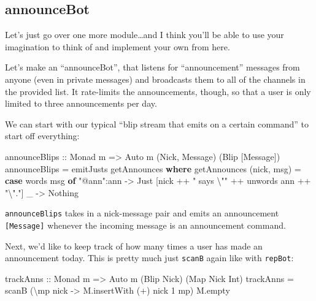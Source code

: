 \documentclass[]{article}
\newenvironment{Shaded}{}{}
\newcommand{\KeywordTok}[1]{\textcolor[rgb]{0.00,0.44,0.13}{\textbf{{#1}}}}
\newcommand{\DataTypeTok}[1]{\textcolor[rgb]{0.56,0.13,0.00}{{#1}}}
\newcommand{\DecValTok}[1]{\textcolor[rgb]{0.25,0.63,0.44}{{#1}}}
\newcommand{\StringTok}[1]{\textcolor[rgb]{0.25,0.44,0.63}{{#1}}}
\newcommand{\OtherTok}[1]{\textcolor[rgb]{0.00,0.44,0.13}{{#1}}}
\newcommand{\FunctionTok}[1]{\textcolor[rgb]{0.02,0.16,0.49}{{#1}}}
\newcommand{\NormalTok}[1]{{#1}}
\begin{document}
\subsection{announceBot}\label{announcebot}

Let's just go over one more module\ldots{}and I think you'll be able to
use your imagination to think of and implement your own from here.

Let's make an ``announceBot'', that listens for ``announcement''
messages from anyone (even in private messages) and broadcasts them to
all of the channels in the provided list. It rate-limits the
announcements, though, so that a user is only limited to three
announcements per day.

We can start with our typical ``blip stream that emits on a certain
command'' to start off everything:

\begin{Shaded}
\begin{Highlighting}[]
\OtherTok{announceBlips ::} \DataTypeTok{Monad} \NormalTok{m }\OtherTok{=>} \DataTypeTok{Auto} \NormalTok{m (}\DataTypeTok{Nick}\NormalTok{, }\DataTypeTok{Message}\NormalTok{) (}\DataTypeTok{Blip} \NormalTok{[}\DataTypeTok{Message}\NormalTok{])}
\NormalTok{announceBlips }\FunctionTok{=} \NormalTok{emitJusts getAnnounces}
  \KeywordTok{where}
    \NormalTok{getAnnounces (nick, msg) }\FunctionTok{=}
      \KeywordTok{case} \NormalTok{words msg }\KeywordTok{of}
        \StringTok{"@ann"}\FunctionTok{:}\NormalTok{ann }\OtherTok{->} \DataTypeTok{Just} \NormalTok{[nick }\FunctionTok{++} \StringTok{" says \textbackslash{}""} \FunctionTok{++} \NormalTok{unwords ann }\FunctionTok{++} \StringTok{"\textbackslash{}"."}\NormalTok{]}
        \NormalTok{_          }\OtherTok{->} \DataTypeTok{Nothing}
\end{Highlighting}
\end{Shaded}

\texttt{announceBlips} takes in a nick-message pair and emits an
announcement \texttt{{[}Message{]}} whenever the incoming message is an
announcement command.

Next, we'd like to keep track of how many times a user has made an
announcement today. This is pretty much just \texttt{scanB} again like
with \texttt{repBot}:

\begin{Shaded}
\begin{Highlighting}[]
\OtherTok{trackAnns ::} \DataTypeTok{Monad} \NormalTok{m }\OtherTok{=>} \DataTypeTok{Auto} \NormalTok{m (}\DataTypeTok{Blip} \DataTypeTok{Nick}\NormalTok{) (}\DataTypeTok{Map} \DataTypeTok{Nick} \DataTypeTok{Int}\NormalTok{)}
\NormalTok{trackAnns }\FunctionTok{=} \NormalTok{scanB (\textbackslash{}mp nick }\OtherTok{->} \NormalTok{M.insertWith (}\FunctionTok{+}\NormalTok{) nick }\DecValTok{1} \NormalTok{mp) M.empty}
\end{Highlighting}
\end{Shaded}
\end{document}
